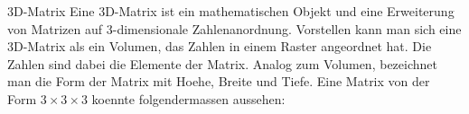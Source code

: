 \documentclass[../main]{subfiles}
\begin{document}
\begin{defbox}{3D-Matrix}
  Eine 3D-Matrix ist ein mathematischen Objekt und eine Erweiterung von Matrizen
  auf 3-dimensionale Zahlenanordnung. Vorstellen kann man sich eine 3D-Matrix
  als ein Volumen, das Zahlen in einem Raster angeordnet hat.
  Die Zahlen sind dabei die Elemente der Matrix. Analog zum Volumen, bezeichnet
  man die Form der Matrix mit Hoehe, Breite und Tiefe.
  Eine Matrix von der Form $3 \times 3 \times 3$ koennte folgendermassen
  aussehen:
  \para{}








\end{defbox}
\end{document}
